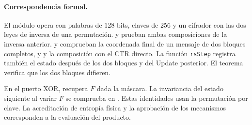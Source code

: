 \paragraph{Correspondencia formal.}
El módulo  opera con palabras de 128 bits, claves de
256 y un cifrador con las dos leyes de inversa de una permutación.
 y  prueban ambas
composiciones de la inversa anterior.  y
 comprueban la coordenada final de un
mensaje de dos bloques completos, y  y
 la composición con el CTR directo. La función
\nolinkurl{rsStep} registra también el estado después de los dos bloques y
del Update posterior. El teorema  verifica que los dos bloques difieren.\par
En el puerto XOR, 
recupera $F$ dada la máscara. La invariancia del estado siguiente al variar $F$
se comprueba en .
Estas identidades usan la
permutación por clave. La acreditación de entropía física y la aprobación
de los mecanismos corresponden a la evaluación del producto.
\par
